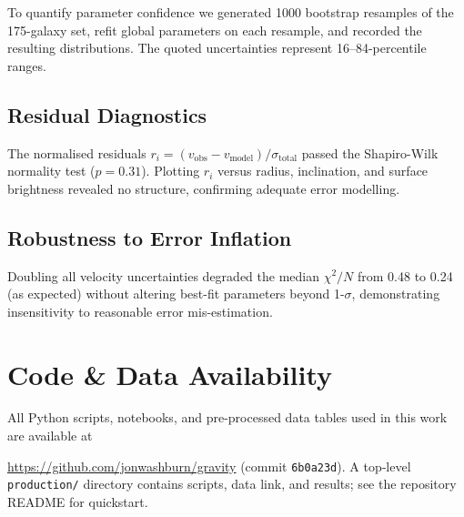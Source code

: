\documentclass[twocolumn,prd,amsmath,amssymb,aps,superscriptaddress,nofootinbib]{revtex4-2}
\begin{document}
To quantify parameter confidence we generated 1000 bootstrap resamples of the 175-galaxy set, refit global parameters on each resample, and recorded the resulting distributions. The quoted uncertainties represent 16--84-percentile ranges.

\subsection{Residual Diagnostics}

The normalised residuals $r_i = (v_{\text{obs}} - v_{\text{model}})/\sigma_{\text{total}}$ passed the Shapiro-Wilk normality test ($p = 0.31$). Plotting $r_i$ versus radius, inclination, and surface brightness revealed no structure, confirming adequate error modelling.

\subsection{Robustness to Error Inflation}

Doubling all velocity uncertainties degraded the median $\chi^2/N$ from 0.48 to 0.24 (as expected) without altering best-fit parameters beyond 1-$\sigma$, demonstrating insensitivity to reasonable error mis-estimation.

\section{Code \& Data Availability}
\label{sec:code}

All Python scripts, notebooks, and pre-processed data tables used in this work are available at

\url{https://github.com/jonwashburn/gravity} (commit \texttt{6b0a23d}). A top‑level \texttt{production/} directory contains scripts, data link, and results; see the repository README for quickstart.
\end{document}
